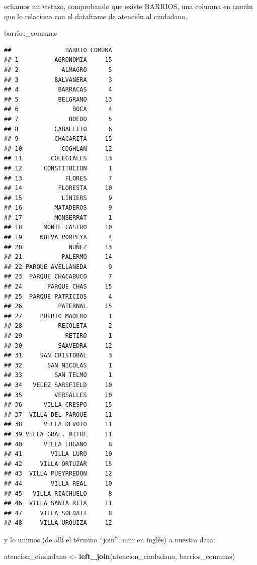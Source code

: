 \documentclass[]{book}
\newenvironment{Shaded}{\begin{snugshade}}{\end{snugshade}}
\newcommand{\KeywordTok}[1]{\textcolor[rgb]{0.13,0.29,0.53}{\textbf{#1}}}
\newcommand{\StringTok}[1]{\textcolor[rgb]{0.31,0.60,0.02}{#1}}
\newcommand{\NormalTok}[1]{#1}
\begin{document}
echamos un vistazo, comprobando que existe BARRIOS, una columna en común
que lo relaciona con el dataframe de atención al ciudadano,

\begin{Shaded}
\begin{Highlighting}[]
\NormalTok{barrios_comunas}
\end{Highlighting}
\end{Shaded}

\begin{verbatim}
##               BARRIO COMUNA
## 1          AGRONOMIA     15
## 2            ALMAGRO      5
## 3          BALVANERA      3
## 4           BARRACAS      4
## 5           BELGRANO     13
## 6               BOCA      4
## 7              BOEDO      5
## 8          CABALLITO      6
## 9          CHACARITA     15
## 10           COGHLAN     12
## 11        COLEGIALES     13
## 12      CONSTITUCION      1
## 13            FLORES      7
## 14          FLORESTA     10
## 15           LINIERS      9
## 16         MATADEROS      9
## 17         MONSERRAT      1
## 18      MONTE CASTRO     10
## 19     NUEVA POMPEYA      4
## 20             NUÑEZ     13
## 21           PALERMO     14
## 22 PARQUE AVELLANEDA      9
## 23  PARQUE CHACABUCO      7
## 24       PARQUE CHAS     15
## 25  PARQUE PATRICIOS      4
## 26          PATERNAL     15
## 27     PUERTO MADERO      1
## 28          RECOLETA      2
## 29            RETIRO      1
## 30          SAAVEDRA     12
## 31     SAN CRISTOBAL      3
## 32       SAN NICOLAS      1
## 33         SAN TELMO      1
## 34   VELEZ SARSFIELD     10
## 35         VERSALLES     10
## 36      VILLA CRESPO     15
## 37  VILLA DEL PARQUE     11
## 38      VILLA DEVOTO     11
## 39 VILLA GRAL. MITRE     11
## 40      VILLA LUGANO      8
## 41        VILLA LURO     10
## 42     VILLA ORTUZAR     15
## 43  VILLA PUEYRREDON     12
## 44        VILLA REAL     10
## 45   VILLA RIACHUELO      8
## 46  VILLA SANTA RITA     11
## 47     VILLA SOLDATI      8
## 48     VILLA URQUIZA     12
\end{verbatim}

y lo unimos (de allí el término ``join'', unir en inglés) a nuestra
data:

\begin{Shaded}
\begin{Highlighting}[]
\NormalTok{atencion_ciudadano <-}\StringTok{ }\KeywordTok{left_join}\NormalTok{(atencion_ciudadano, barrios_comunas)}
\end{Highlighting}
\end{Shaded}
\end{document}
